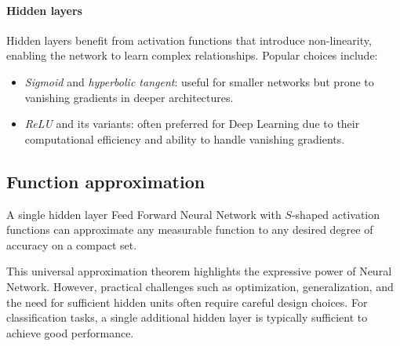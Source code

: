 \paragraph*{Hidden layers}
Hidden layers benefit from activation functions that introduce non-linearity, enabling the network to learn complex relationships. Popular choices include:
\begin{itemize}
    \item \textit{Sigmoid} and \textit{hyperbolic tangent}: useful for smaller networks but prone to vanishing gradients in deeper architectures.
    \item \textit{ReLU} and its variants: often preferred for Deep Learning due to their computational efficiency and ability to handle vanishing gradients.
\end{itemize}

\subsection{Function approximation}
\begin{theorem}
    A single hidden layer Feed Forward Neural Network with $S$-shaped activation functions can approximate any measurable function to any desired degree of accuracy on a compact set.
\end{theorem}
\noindent This universal approximation theorem highlights the expressive power of Neural Network. 
However, practical challenges such as optimization, generalization, and the need for sufficient hidden units often require careful design choices.
For classification tasks, a single additional hidden layer is typically sufficient to achieve good performance.